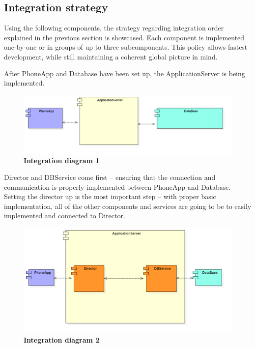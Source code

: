 \subsection{Integration strategy}

\hspace{\parindent}Using the following components, the strategy regarding integration order explained in the previous section is showcased. Each component is implemented one-by-one or in groups of up to three subcomponents. This policy allows fastest development, while still maintaining a coherent global picture in mind. 

 
After PhoneApp and Database have been set up, the ApplicationServer is being implemented. 

 
\begin{figure}[!h]
\centering
\includegraphics[width=\textwidth]{Images/IntegrationDiagram1}
\caption{\label{fig:imp1}\textbf{Integration diagram 1}}
\end{figure}
 

Director and DBService come first – ensuring that the connection and communication is properly implemented between PhoneApp and Database. Setting the director up is the most important step – with proper basic implementation, all of the other components and services are going to be to easily implemented and connected to Director.  

 

\begin{figure}[!h]
\centering
\includegraphics[width=\textwidth]{Images/IntegrationDiagram2}
\caption{\label{fig:imp2}\textbf{Integration diagram 2}}
\end{figure}

